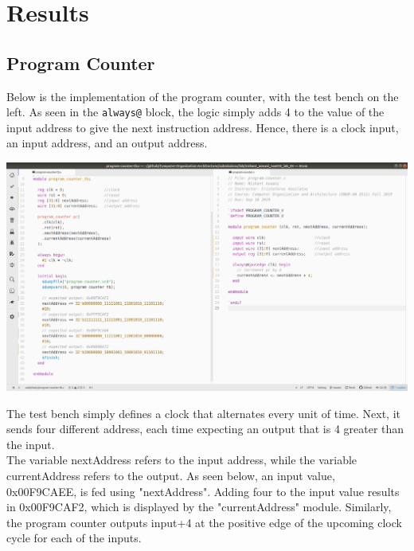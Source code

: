 \documentclass[twocolumn]{article}
\newcommand{\cc}[1]{\texttt{#1}}
\begin{document}
\newpage

\section{Results}

\subsection{Program Counter}

Below is the implementation of the program counter, with the test bench on the left. As seen in the \cc{always@} block, the logic simply adds 4 to the value of the input address to give the next instruction address. Hence, there is a clock input, an input address, and an output address.  

\begingroup
    \centering
    \medskip
    \includegraphics[width=\columnwidth]{Lab-Tex/Lab3-images/program-counter.png}
    \medskip
\endgroup

The test bench simply defines a clock that alternates every unit of time. Next, it sends four different address, each time expecting an output that is 4 greater than the input.\\

The variable nextAddress refers to the input address, while the variable currentAddress refers to the output. As seen below, an input value, 0x00F9CAEE, is fed using "nextAddress". Adding four to the input value results in 0x00F9CAF2, which is displayed by the "currentAddress" module. Similarly, the program counter outputs input+4 at the positive edge of the upcoming clock cycle for each of the inputs. \\
\end{document}
